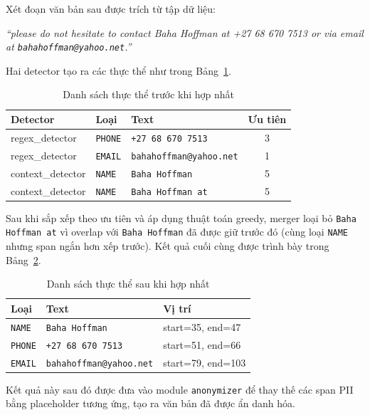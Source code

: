 Xét đoạn văn bản sau được trích từ tập dữ liệu:

\begin{center}
\textit{``please do not hesitate to contact Baha Hoffman at +27 68 670 7513
or via email at \texttt{bahahoffman@yahoo.net}.''}
\end{center}

Hai detector tạo ra các thực thể như trong Bảng~\ref{tab:overlap_before}.

\begin{table}[H]
    \centering
    \caption{Danh sách thực thể trước khi hợp nhất}
    \label{tab:overlap_before}
    \renewcommand{\arraystretch}{1.3}
    \begin{tabular}{l l l c}
        \toprule
        \textbf{Detector} & \textbf{Loại} & \textbf{Text} & \textbf{Ưu tiên} \\
        \midrule
        regex\_detector & \texttt{PHONE} & \texttt{+27 68 670 7513} & 3 \\
        regex\_detector & \texttt{EMAIL} & \texttt{bahahoffman@yahoo.net} & 1 \\
        context\_detector & \texttt{NAME}  & \texttt{Baha Hoffman} & 5 \\
        context\_detector & \texttt{NAME}  & \texttt{Baha Hoffman at} & 5 \\
        \bottomrule
    \end{tabular}
\end{table}

Sau khi sắp xếp theo ưu tiên và áp dụng thuật toán greedy, merger loại bỏ
\texttt{Baha Hoffman at} vì overlap với \texttt{Baha Hoffman} đã được giữ
trước đó (cùng loại \texttt{NAME} nhưng span ngắn hơn xếp trước).
Kết quả cuối cùng được trình bày trong Bảng~\ref{tab:overlap_after}.

\begin{table}[H]
    \centering
    \caption{Danh sách thực thể sau khi hợp nhất}
    \label{tab:overlap_after}
    \renewcommand{\arraystretch}{1.3}
    \begin{tabular}{l l l}
        \toprule
        \textbf{Loại} & \textbf{Text} & \textbf{Vị trí} \\
        \midrule
        \texttt{NAME}  & \texttt{Baha Hoffman}            & start=35, end=47  \\
        \texttt{PHONE} & \texttt{+27 68 670 7513}          & start=51, end=66  \\
        \texttt{EMAIL} & \texttt{bahahoffman@yahoo.net}    & start=79, end=103 \\
        \bottomrule
    \end{tabular}
\end{table}

Kết quả này sau đó được đưa vào module \texttt{anonymizer} để thay thế các
span PII bằng placeholder tương ứng, tạo ra văn bản đã được ẩn danh hóa.
